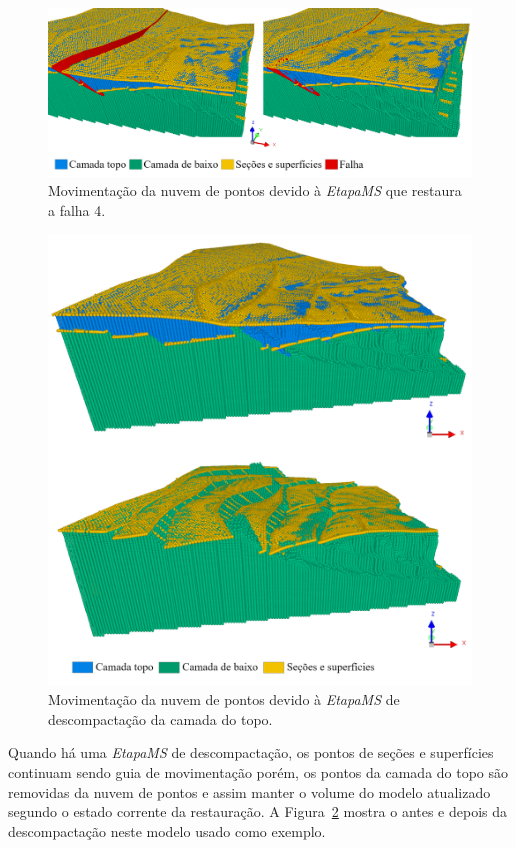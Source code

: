 \begin{figure} [H]
  \begin{center}
    \includegraphics[width=\textwidth]{images/fig-vol-ex-6}
    \caption{Movimentação da nuvem de pontos devido à \emph{EtapaMS} que restaura a falha 4.}\label{fig-vol-ex-6}
  \end{center}
\end{figure}

\begin{figure} [H]
  \begin{center}
    \includegraphics[width=350pt]{images/fig-vol-ex-7}
    \caption{Movimentação da nuvem de pontos devido à \emph{EtapaMS} de descompactação da camada do topo.}\label{fig-vol-ex-7}
  \end{center}
\end{figure}

Quando há uma \emph{EtapaMS} de descompactação, os pontos de seções e superfícies continuam sendo guia de movimentação porém, os pontos da camada do topo são removidas da nuvem de pontos e assim manter o volume do modelo atualizado segundo o estado corrente da restauração. A Figura~\ref{fig-vol-ex-7} mostra o antes e depois da descompactação neste modelo usado como exemplo.

